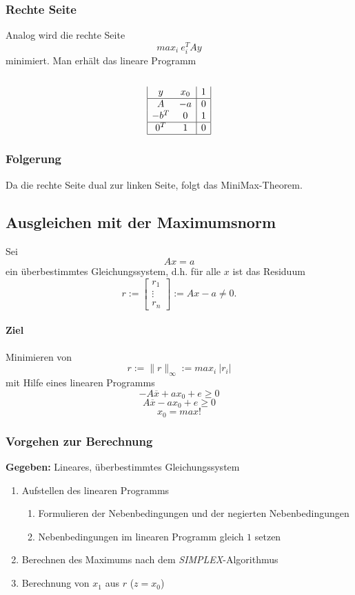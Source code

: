 \subsubsection{Rechte Seite}
Analog wird die rechte Seite
\[max_i~e_i^T A y\]
minimiert. Man erhält das lineare Programm
\\\\
\[\begin{array}{|cc|c|}
y & x_0 & 1 \\
\hline
A & -a & 0 \\
-b^T & 0 & 1 \\
\hline
0^T & 1 & 0 \\
\hline
\end{array}\]

\subsubsection{Folgerung}
Da die rechte Seite dual zur linken Seite, folgt das MiniMax-Theorem.


\subsection{Ausgleichen mit der Maximumsnorm}
Sei
\[Ax = a\]
ein überbestimmtes Gleichungssystem, d.h. für alle \(x\) ist das Residuum
\[r := \begin{bmatrix} r_1 \\ \vdots \\ r_n \end{bmatrix} := Ax - a \ne 0.\]
\paragraph{Ziel} Minimieren von
\[r := \parallel r \parallel_{\infty} := max_i~|r_i|\]
mit Hilfe eines linearen Programms
\[-A\overline{x} + ax_0 + e \geq 0\]
\[A\overline{x} - ax_0 + e \geq 0\]
\[x_0 = max!\]

\subsubsection{Vorgehen zur Berechnung}
\textbf{Gegeben:} Lineares, überbestimmtes Gleichungssystem
\begin{enumerate}
	\item Aufstellen des linearen Programms
	\begin{enumerate}
		\item Formulieren der Nebenbedingungen und der negierten Nebenbedingungen
		\item Nebenbedingungen im linearen Programm gleich \(1\) setzen
	\end{enumerate}
	\item Berechnen des Maximums nach dem \textit{SIMPLEX}-Algorithmus
	\item Berechnung von \(x_1\) aus \(r\) (\(z = x_0\))
\end{enumerate}


